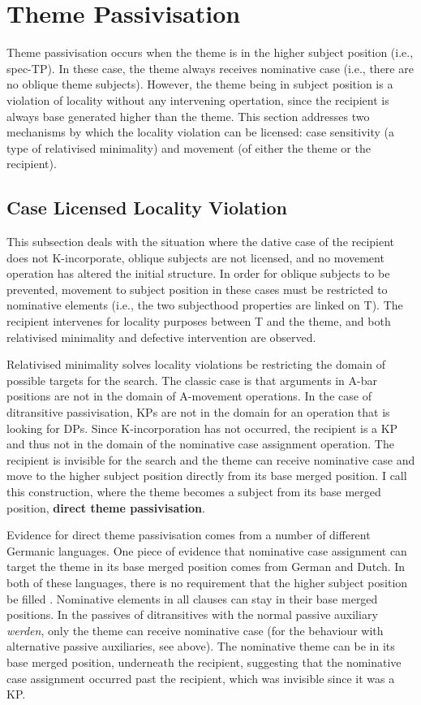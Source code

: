 {\section{Theme Passivisation}
Theme passivisation occurs when the theme is in the higher subject position (i.e., spec-TP). In these case, the theme always receives nominative case (i.e., there are no oblique theme subjects). However, the theme being in subject position is a violation of locality without any intervening opertation, since the recipient is always base generated higher than the theme. This section addresses two mechanisms by which the locality violation can be licensed: case sensitivity (a type of relativised minimality) and movement (of either the theme or the recipient).


\subsection{Case Licensed Locality Violation}
This subsection deals with the situation where the dative case of the recipient does not K-incorporate, oblique subjects are not licensed, and no movement operation has altered the initial structure. In order for oblique subjects to be prevented, movement to subject position in these cases must be restricted to nominative elements (i.e., the two subjecthood properties are linked on T). The recipient intervenes for locality purposes between T and the theme, and both relativised minimality and defective intervention are observed.

Relativised minimality \citep{Rizzi.1990} solves locality violations be restricting the domain of possible targets for the search. The classic case is that arguments in A-bar positions are not in the domain of A-movement operations. In the case of ditransitive passivisation, KPs are not in the domain for an operation that is looking for DPs. Since K-incorporation has not occurred, the recipient is a KP and thus not in the domain of the nominative case assignment operation. The recipient is invisible for the search and the theme can receive nominative case and move to the higher subject position directly from its base merged position. I call this construction, where the theme becomes a subject from its base merged position, \textbf{direct theme passivisation}.

Evidence for direct theme passivisation comes from a number of different Germanic languages. One piece of evidence that nominative case assignment can target the theme in its base merged position comes from German and Dutch. In both of these languages, there is no requirement that the higher subject position be filled \citep{Besten.1990}. Nominative elements in all clauses can stay in their base merged positions. In the passives of ditransitives with the normal passive auxiliary \textit{werden}, only the theme can receive nominative case (for the behaviour with alternative passive auxiliaries, see above). The nominative theme can be in its base merged position, underneath the recipient, suggesting that the nominative case assignment occurred past the recipient, which was invisible since it was a KP.

}
